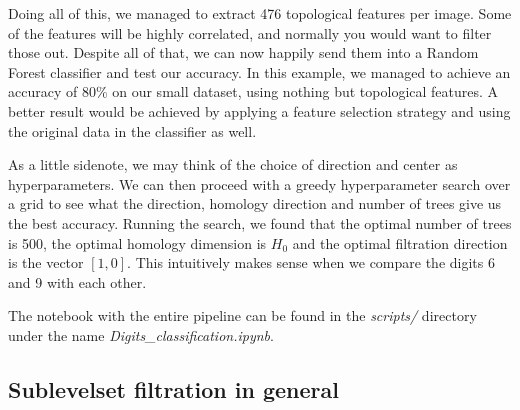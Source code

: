 Doing all of this, we managed to extract 476 topological features per image. Some of the features will be highly correlated, and normally you would want to filter those out. Despite all of that, we can now happily send them into a Random Forest classifier and test our accuracy. In this example, we managed to achieve an accuracy of 80\% on our small dataset, using nothing but topological features. A better result would be achieved by applying a feature selection strategy and using the original data in the classifier as well.

As a little sidenote, we may think of the choice of direction and center as hyperparameters. We can then proceed with a greedy hyperparameter search over a grid to see what the direction, homology direction and number of trees give us the best accuracy. Running the search, we found that the optimal number of trees is 500, the optimal homology dimension is $H_{0}$ and the optimal filtration direction is the vector $[1, 0]$. This intuitively makes sense when we compare the digits 6 and 9 with each other.

The notebook with the entire pipeline can be found in the \textit{scripts/} directory under the name \textit{Digits\_classification.ipynb}.

\subsection{Sublevelset filtration in general}

